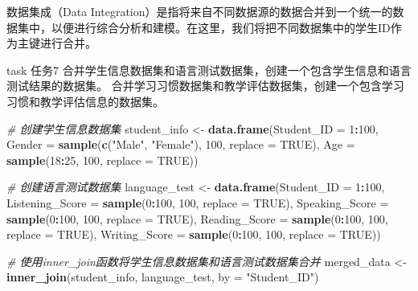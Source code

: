 \documentclass[]{book}
\newenvironment{Shaded}{\begin{snugshade}}{\end{snugshade}}
\newcommand{\CommentTok}[1]{\textcolor[rgb]{0.56,0.35,0.01}{\textit{#1}}}
\newcommand{\DataTypeTok}[1]{\textcolor[rgb]{0.13,0.29,0.53}{#1}}
\newcommand{\DecValTok}[1]{\textcolor[rgb]{0.00,0.00,0.81}{#1}}
\newcommand{\KeywordTok}[1]{\textcolor[rgb]{0.13,0.29,0.53}{\textbf{#1}}}
\newcommand{\NormalTok}[1]{#1}
\newcommand{\OperatorTok}[1]{\textcolor[rgb]{0.81,0.36,0.00}{\textbf{#1}}}
\newcommand{\OtherTok}[1]{\textcolor[rgb]{0.56,0.35,0.01}{#1}}
\newcommand{\StringTok}[1]{\textcolor[rgb]{0.31,0.60,0.02}{#1}}
\begin{document}
数据集成（Data Integration）是指将来自不同数据源的数据合并到一个统一的数据集中，以便进行综合分析和建模。在这里，我们将把不同数据集中的学生ID作为主键进行合并。

\begin{infobox}task
任务7
合并学生信息数据集和语言测试数据集，创建一个包含学生信息和语言测试结果的数据集。
合并学习习惯数据集和教学评估数据集，创建一个包含学习习惯和教学评估信息的数据集。

\end{infobox}

\begin{Shaded}
\begin{Highlighting}[]
\CommentTok{# 创建学生信息数据集}
\NormalTok{student_info <-}\StringTok{ }\KeywordTok{data.frame}\NormalTok{(}\DataTypeTok{Student_ID =} \DecValTok{1}\OperatorTok{:}\DecValTok{100}\NormalTok{,}
                       \DataTypeTok{Gender =} \KeywordTok{sample}\NormalTok{(}\KeywordTok{c}\NormalTok{(}\StringTok{"Male"}\NormalTok{, }\StringTok{"Female"}\NormalTok{), }\DecValTok{100}\NormalTok{, }\DataTypeTok{replace =} \OtherTok{TRUE}\NormalTok{),}
                       \DataTypeTok{Age =} \KeywordTok{sample}\NormalTok{(}\DecValTok{18}\OperatorTok{:}\DecValTok{25}\NormalTok{, }\DecValTok{100}\NormalTok{, }\DataTypeTok{replace =} \OtherTok{TRUE}\NormalTok{))}

\CommentTok{# 创建语言测试数据集}
\NormalTok{language_test <-}\StringTok{ }\KeywordTok{data.frame}\NormalTok{(}\DataTypeTok{Student_ID =} \DecValTok{1}\OperatorTok{:}\DecValTok{100}\NormalTok{,}
                        \DataTypeTok{Listening_Score =} \KeywordTok{sample}\NormalTok{(}\DecValTok{0}\OperatorTok{:}\DecValTok{100}\NormalTok{, }\DecValTok{100}\NormalTok{, }\DataTypeTok{replace =} \OtherTok{TRUE}\NormalTok{),}
                        \DataTypeTok{Speaking_Score =} \KeywordTok{sample}\NormalTok{(}\DecValTok{0}\OperatorTok{:}\DecValTok{100}\NormalTok{, }\DecValTok{100}\NormalTok{, }\DataTypeTok{replace =} \OtherTok{TRUE}\NormalTok{),}
                        \DataTypeTok{Reading_Score =} \KeywordTok{sample}\NormalTok{(}\DecValTok{0}\OperatorTok{:}\DecValTok{100}\NormalTok{, }\DecValTok{100}\NormalTok{, }\DataTypeTok{replace =} \OtherTok{TRUE}\NormalTok{),}
                        \DataTypeTok{Writing_Score =} \KeywordTok{sample}\NormalTok{(}\DecValTok{0}\OperatorTok{:}\DecValTok{100}\NormalTok{, }\DecValTok{100}\NormalTok{, }\DataTypeTok{replace =} \OtherTok{TRUE}\NormalTok{))}

\CommentTok{# 使用inner_join函数将学生信息数据集和语言测试数据集合并}
\NormalTok{merged_data <-}\StringTok{ }\KeywordTok{inner_join}\NormalTok{(student_info, language_test, }\DataTypeTok{by =} \StringTok{"Student_ID"}\NormalTok{)}



\end{Highlighting}
\end{Shaded}
\end{document}
